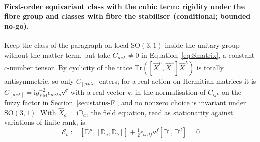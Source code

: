 \paragraph{First-order equivariant class with the cubic term: rigidity under the fibre group and classes with fibre the stabiliser (conditional; bounded no-go).}
Keep the class of the paragraph on local \(\mathrm{SO}(3,1)\) inside the unitary group without the matter term, but take \(C_{\mu\nu\lambda}\neq0\) in Equation~\eqref{eq:Smatrix}, a constant \(c\)-number tensor. By cyclicity of the trace \(\mathrm{Tr}([\hat X^\mu,\hat X^\nu]\hat X^\lambda)\) is totally antisymmetric, so only \(C_{[\mu\nu\lambda]}\) enters; for a real action on Hermitian matrices it is \(C_{[\mu\nu\lambda]}=\mathrm i g_{\mathrm{YM}}^{-2}\epsilon_{\mu\nu\lambda\sigma}\mathsf v^\sigma\) with a real vector \(\mathsf v\), in the normalisation of \(C_{ijk}\) on the fuzzy factor in Section~\ref{sec:status-F}, and no nonzero choice is invariant under \(\mathrm{SO}(3,1)\). With \(\hat X_a=\mathrm i\mathbb D_a\), the field equation, read as stationarity against variations of finite rank, is
\[
\mathcal E_b:=[\mathbb D^a,[\mathbb D_a,\mathbb D_b]]+\tfrac12\epsilon_{bcdf}\mathsf v^f[\mathbb D^c,\mathbb D^d]=0
\]
